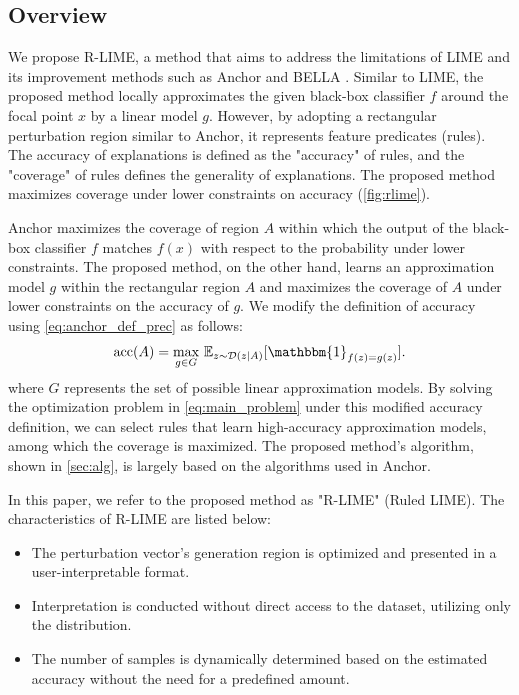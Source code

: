\documentclass[runningheads]{llncs}
\begin{document}
\subsection{Overview}
We propose R-LIME,
a method that aims to address the limitations of LIME \cite{ribeiro2016why}
and its improvement methods such as
Anchor \cite{ribeiro2018anchors} and BELLA \cite{radulovic2023bella}.
Similar to LIME,
the proposed method locally approximates the given black-box classifier $f$
around the focal point $x$ by a linear model $g$.
However,
by adopting a rectangular perturbation region similar to Anchor,
it represents feature predicates (rules).
The accuracy of explanations is defined as the "accuracy" of rules,
and the "coverage" of rules defines the generality of explanations.
The proposed method maximizes coverage under lower constraints on accuracy
(\cref{fig:rlime}).

Anchor maximizes the coverage of region $A$ within which the output of the black-box classifier $f$ matches $f(x)$ with respect to the probability under lower constraints. The proposed method, on the other hand, learns an approximation model $g$ within the rectangular region $A$ and maximizes the coverage of $A$ under lower constraints on the accuracy of $g$. We modify the definition of accuracy using \cref{eq:anchor_def_prec} as follows:
\begin{equation}
  \Prec(A)=\underset{g\in G}{\max}\ \mathbb{E}_{z\sim\mathcal{D}(z|A)}
  [\mathbbm{1}_{f(z)=g(z)}]. \label{eq:def_prec}
\end{equation}
where $G$ represents the set of possible linear approximation models. By solving the optimization problem in \cref{eq:main_problem} under this modified accuracy definition, we can select rules that learn high-accuracy approximation models, among which the coverage is maximized. The proposed method's algorithm, shown in \cref{sec:alg}, is largely based on the algorithms used in Anchor.

In this paper, we refer to the proposed method as "R-LIME" (Ruled LIME). The characteristics of R-LIME are listed below:
\begin{itemize}
  \item The perturbation vector's generation region is optimized and presented in a user-interpretable format.
  \item Interpretation is conducted without direct access to the dataset, utilizing only the distribution.
  \item The number of samples is dynamically determined based on the estimated accuracy without the need for a predefined amount.
\end{itemize}
\end{document}
